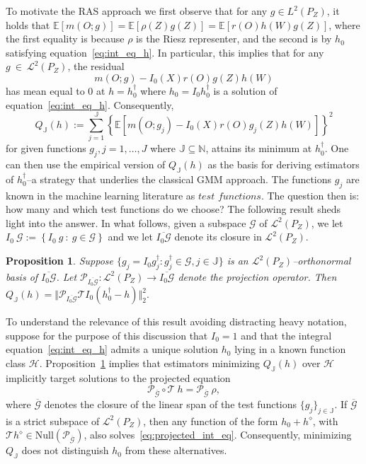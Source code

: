 \documentclass[twoside,11pt]{article}
\newtheorem{proposition}{Proposition}
\newcommand{\mc}{\mathcal}
\begin{document}
To motivate the RAS approach we first observe that for any $g \in L^2(P_Z)$, it holds that
$\mathbb{E}[m(O;g)]=\mathbb{E}[\rho(Z)g(Z)]
=\mathbb{E}[r(O) h(W)g(Z)]$,
where the first equality is because $\rho$ is the Riesz representer, and the second is by $h_0$ satisfying equation~\eqref{eq:int_eq_h}. In particular, this implies that for any $g \: \in \: \mc{L}^2(P_Z)$, the residual
\begin{equation}
     m(O;g)-I_0(X) r(O) g(Z)h(W) \label{eq:residuals}
\end{equation}
has mean equal to 0 at $h=h_0^\dag$ where $h_0=I_0h_0^\dag$ is a solution of equation~\eqref{eq:int_eq_h}. Consequently, 
\begin{equation*}
Q_{\mathbb{J}}(h):=\sum_{j=1}^{\mathbb{J}} \left\{\mathbb{E}[m(O;g_j)-I_0(X) r(O) g_j(Z)h(W)]\right\}^2
\end{equation*}
for given functions $g_j, j = 1, \dots , J $ where $\mathbb{J} \subseteq \mathbb{N}$, attains its minimum at $h_0^\dag$. One can then use the empirical version of $Q_{\mathbb{J}}(h)$ as the basis for deriving estimators of $h_{0}^{\dag}$--a strategy that underlies the classical GMM approach. The functions $g_j$ are known in the machine learning literature as $\textit{test functions}$. The question then is: how many and which test functions do we choose? The following result sheds light into the answer. In what follows, given a subspace $\mc{G}$ of $\mc{L}^2(P_Z)$, we let $I_0\:\mc{G}:=\left\{I_0\:g\::\:g\in\mc{G}\right\}$
and we let $\overline{I_0\mc{G}}$ denote its closure in $\mc{L}^2(P_Z)$. 
\begin{proposition}    
Suppose $\{g_j=I_0g_j^\dag:g_j^\dag \in \mc{G},j\in\mathbb{J}\}$ is an $\mc{L}^2(P_Z)$--orthonormal basis of $\overline{I_0\mc{G}}$. Let $\mathcal{P}_{\overline{I_0\mc{G}}}:\mc{L}^2(P_Z) \rightarrow \overline{I_0\mc{G}}$  denote the projection operator. Then 
$ 
Q_{\mathbb{J}}(h)=\Vert\mathcal{P}_{\overline{I_0\mc{G}}} \mc{T} I_0(h_0^\dag-h)\Vert_2^2. $\label{prop:sum_squares}
\end{proposition}
To understand the relevance of this result avoiding distracting heavy notation, suppose for the purpose of this discussion that $I_0 = 1$ and that the integral equation~\eqref{eq:int_eq_h} admits a unique solution $h_0$ lying in a known function class $\mathcal{H}$. Proposition~\ref{prop:sum_squares} implies that estimators minimizing $Q_{\mathbb{J}}(h)$ over $\mathcal{H}$ implicitly target solutions to the projected equation
\begin{equation}
\mathcal{P}_{\overline{\mathcal{G}}} \circ \mathcal{T} \: h = \mathcal{P}_{\overline{\mathcal{G}}} \: \rho,\label{eq:projected_int_eq}
\end{equation}
where $\overline{\mathcal{G}}$ denotes the closure of the linear span of the test functions $\{g_j\}_{j \in \mathbb{J}}$. If $\overline{\mathcal{G}}$ is a strict subspace of $\mathcal{L}^2(P_Z)$, then any function of the form $h_0 + h^\diamond$, with $\mathcal{T} h^\diamond \in \text{Null}(\mathcal{P}_{\overline{\mathcal{G}}})$, also solves~\eqref{eq:projected_int_eq}. Consequently, minimizing $Q_{\mathbb{J}}$ does not distinguish $h_0$ from these alternatives.
\end{document}
